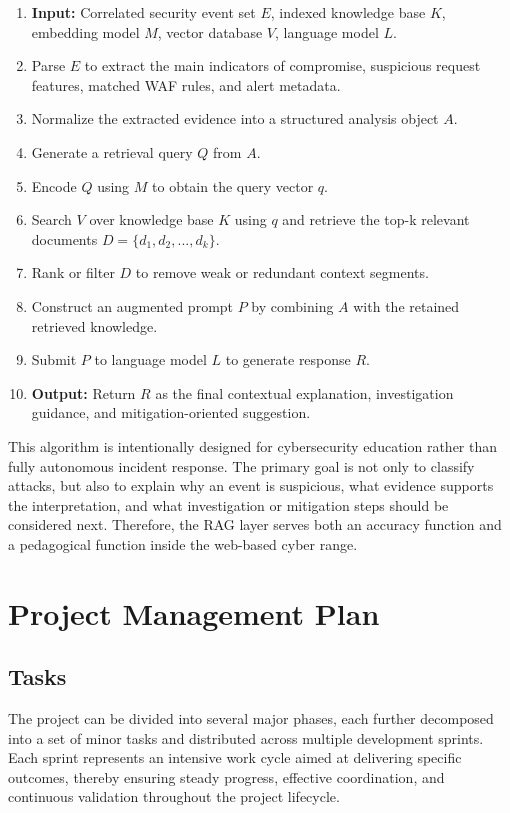 \begin{enumerate}
	\item \textbf{Input:} Correlated security event set $E$, indexed knowledge base $K$, embedding model $M$, vector database $V$, language model $L$.
	\item Parse $E$ to extract the main indicators of compromise, suspicious request features, matched WAF rules, and alert metadata.
	\item Normalize the extracted evidence into a structured analysis object $A$.
	\item Generate a retrieval query $Q$ from $A$.
	\item Encode $Q$ using $M$ to obtain the query vector $q$.
	\item Search $V$ over knowledge base $K$ using $q$ and retrieve the top-k relevant documents $D = \{d_1, d_2, ..., d_k\}$.
	\item Rank or filter $D$ to remove weak or redundant context segments.
	\item Construct an augmented prompt $P$ by combining $A$ with the retained retrieved knowledge.
	\item Submit $P$ to language model $L$ to generate response $R$.
	\item \textbf{Output:} Return $R$ as the final contextual explanation, investigation guidance, and mitigation-oriented suggestion.
\end{enumerate}

This algorithm is intentionally designed for cybersecurity education rather than fully autonomous incident response. The primary goal is not only to classify attacks, but also to explain why an event is suspicious, what evidence supports the interpretation, and what investigation or mitigation steps should be considered next. Therefore, the RAG layer serves both an accuracy function and a pedagogical function inside the web-based cyber range.

\section{Project Management Plan}

\subsection{Tasks}
The project can be divided into several major phases, each further decomposed into a set of minor tasks and distributed across multiple development sprints. Each sprint represents an intensive work cycle aimed at delivering specific outcomes, thereby ensuring steady progress, effective coordination, and continuous validation throughout the project lifecycle.

